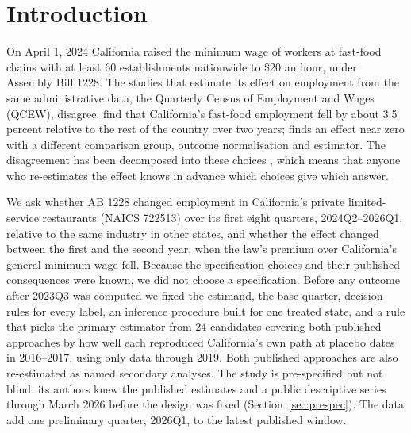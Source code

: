 \section{Introduction}
\label{sec:intro}

On April 1, 2024 California raised the minimum wage of workers at fast-food chains with at least
60 establishments nationwide to \$20 an hour, under Assembly Bill 1228. The studies that
estimate its effect on employment from the same administrative data, the Quarterly Census of Employment and Wages
(QCEW), disagree. \citet{clemens2026employment} find that California's fast-food employment fell
by about 3.5 percent relative to the rest of the country over two years; \citet{dube2026labor}
finds an effect near zero with a different comparison group, outcome normalisation and
estimator. The disagreement has been decomposed into these choices
\citep{dube2026labor,clemens2026synthetic,sosinskiy2026effects}, which means that anyone who
re-estimates the effect knows in advance which choices give which answer.

We ask whether AB 1228 changed employment in California's private limited-service restaurants
(NAICS 722513) over its first eight quarters, 2024Q2--2026Q1, relative to the same industry in
other states, and whether the effect changed between the first and the second year, when the
law's premium over California's general minimum wage fell. Because the specification choices
and their published consequences were known, we did not choose a specification. Before any
outcome after 2023Q3 was computed we fixed the estimand, the base quarter, decision rules for
every label, an inference procedure built for one treated state, and a rule that picks the
primary estimator from 24 candidates covering both published approaches by how well each
reproduced California's own path at placebo dates in 2016--2017, using only data through 2019.
Both published approaches are also re-estimated as named secondary analyses. The study is
pre-specified but not blind: its authors knew the published estimates and a public descriptive
series through March 2026 before the design was fixed (Section~\ref{sec:prespec}). The data add
one preliminary quarter, 2026Q1, to the latest published window.


